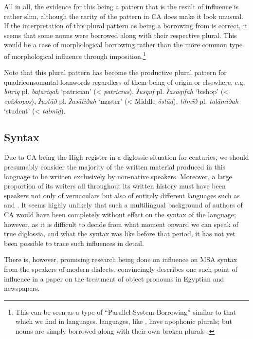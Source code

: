 \documentclass[output=paper]{langsci/langscibook}
\begin{document}
All in all, the evidence for this being a pattern that is the result of  influence is rather slim, although the rarity of the pattern in CA does make it look unusual. If the interpretation of this plural pattern as being a borrowing from  is correct, it seems that some  nouns were borrowed along with their respective plural. This would be a case of morphological borrowing rather than the more common type of morphological influence through {imposition}.\footnote{This can be seen as a type of “Parallel System Borrowing” similar to that which we find in  languages.  languages, like , have apophonic plurals; but  nouns are simply borrowed along with their own  broken plurals \citep{Kossmann2010}.} 

Note that this plural pattern has become the productive plural pattern for quadriconsonantal {loanwords} regardless of them being of  origin or elsewhere, e.g. \textit{biṭrīq} pl. \textit{baṭāriqah} ‘patrician’ (<  \textit{patricius}), \textit{ʔusquf} pl. \textit{ʔasāqifah} ‘bishop’ (<  \textit{epískopos}), \textit{ʔustāð} pl. \textit{ʔasātiðah} ‘master’ (< Middle  \textit{ōstād}), \textit{tilmīð} pl. \textit{talāmiðah} ‘student’ (<  \textit{talmīḏ}).

\subsection{\label{bkm:Ref13224809}Syntax}

Due to CA being the High {register} in a diglossic situation for centuries, we should presumably consider the majority of the written material produced in this language to be written exclusively by non-native speakers. Moreover, a large proportion of its writers all throughout its written history must have been speakers not only of  vernaculars but also of entirely different languages such as  and . It seems highly unlikely that such a multilingual background of authors of CA would have been completely without effect on the syntax of the language; however, as it is difficult to decide from what moment onward we can speak of true {diglossia}, and what the syntax was like before that period, it has not yet been possible to trace such influences in detail.

There is, however, promising research being done on influence on MSA syntax from the speakers of modern  dialects. \citet{Wilmsen2010} convincingly describes one such point of influence in a paper on the treatment of object pronouns in Egyptian and  newspapers.
\end{document}
